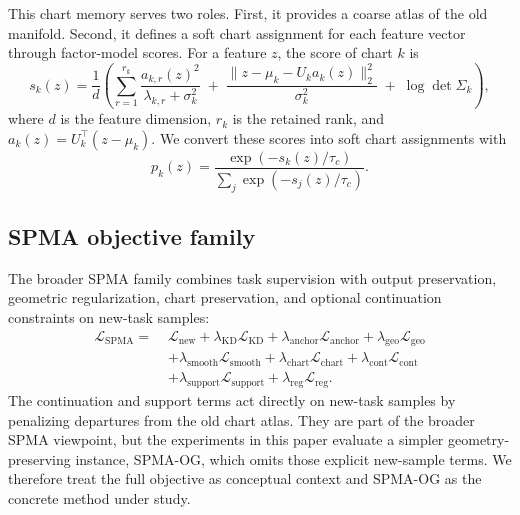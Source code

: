 \documentclass[11pt]{article}
\newcommand{\method}{\textsc{SPMA-OG}}
\newcommand{\spma}{\textsc{SPMA}}
\begin{document}
This chart memory serves two roles. First, it provides a coarse atlas of the old manifold. Second, it defines a soft chart assignment for each feature vector through factor-model scores. For a feature $z$, the score of chart $k$ is
\[
s_k(z) =
\frac{1}{d}
\left(
\sum_{r=1}^{r_k}\frac{a_{k,r}(z)^2}{\lambda_{k,r}+\sigma_k^2}
\;+\;
\frac{\lVert z - \mu_k - U_k a_k(z)\rVert_2^2}{\sigma_k^2}
\;+\;
\log \det \Sigma_k
\right),
\]
where $d$ is the feature dimension, $r_k$ is the retained rank, and $a_k(z)=U_k^\top(z-\mu_k)$. We convert these scores into soft chart assignments with
\[
p_k(z)=\frac{\exp(-s_k(z)/\tau_c)}{\sum_j \exp(-s_j(z)/\tau_c)}.
\]

\subsection{SPMA objective family}
The broader \spma{} family combines task supervision with output preservation, geometric regularization, chart preservation, and optional continuation constraints on new-task samples:
\begin{equation}
\begin{aligned}
\mathcal{L}_{\mathrm{SPMA}}
=\;&
\mathcal{L}_{\text{new}}
+ \lambda_{\text{KD}} \mathcal{L}_{\text{KD}}
+ \lambda_{\text{anchor}} \mathcal{L}_{\text{anchor}}
+ \lambda_{\text{geo}} \mathcal{L}_{\text{geo}} \\
&+ \lambda_{\text{smooth}} \mathcal{L}_{\text{smooth}}
+ \lambda_{\text{chart}} \mathcal{L}_{\text{chart}}
+ \lambda_{\text{cont}} \mathcal{L}_{\text{cont}} \\
&+ \lambda_{\text{support}} \mathcal{L}_{\text{support}}
+ \lambda_{\text{reg}} \mathcal{L}_{\text{reg}}.
\end{aligned}
\end{equation}
The continuation and support terms act directly on new-task samples by penalizing departures from the old chart atlas. They are part of the broader \spma{} viewpoint, but the experiments in this paper evaluate a simpler geometry-preserving instance, \method{}, which omits those explicit new-sample terms. We therefore treat the full objective as conceptual context and \method{} as the concrete method under study.
\end{document}
